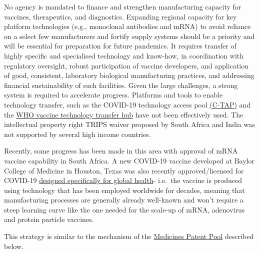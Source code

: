 \documentclass[
  11pt,
  paper=a4,
  ,captions=tableheading
]{scrartcl}
\begin{document}
No agency is mandated to finance and strengthen manufacturing capacity
for vaccines, therapeutics, and diagnostics. Expanding regional capacity
for key platform technologies (e.g., monoclonal antibodies and mRNA) to
avoid reliance on a select few manufacturers and fortify supply systems
should be a priority and will be essential for preparation for future
pandemics. It requires transfer of highly specific and specialised
technology and know-how, in coordination with regulatory oversight,
robust participation of vaccine developers, and application of good,
consistent, laboratory biological manufacturing practices, and
addressing financial sustainability of such facilities. Given the large
challenges, a strong system is required to accelerate progress.
Platforms and tools to enable technology transfer, such as the COVID-19
technology access pool
\href{https://www.who.int/initiatives/covid-19-technology-access-pool}{(C-TAP)}
and the
\href{https://www.who.int/news-room/articles-detail/establishment-of-a-covid-19-mrna-vaccine-technology-transfer-hub-to-scale-up-global-manufacturing}{WHO
vaccine technology transfer hub} have not been effectively used. The
intellectual property right TRIPS waiver proposed by South Africa and
India was not supported by several high income countries.

Recently, some progress has been made in this area with approval of mRNA
vaccine capability in South Africa. A new COVID-19 vaccine developed at
Baylor College of Medicine in Houston, Texas was also recently
approved/licensed for COVID-19
\href{https://www.scientificamerican.com/article/a-covid-vaccine-for-all/}{designed
specifically for global health}- i.e.~the vaccine is produced using
technology that has been employed worldwide for decades, meaning that
manufacturing processes are generally already well-known and won't
require a steep learning curve like the one needed for the scale-up of
mRNA, adenovirus and protein particle vaccines.

This strategy is similar to the mechanism of the
\protect\hyperlink{medicines-patent-pool}{Medicines Patent Pool}
described below.
\end{document}
